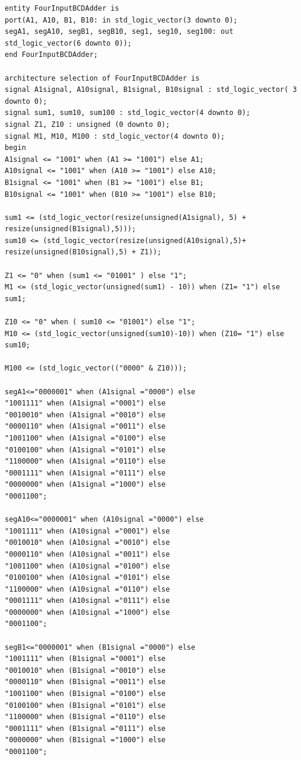 \begin{enumerate}
\begin{lstlisting}[caption={To-input BCD adder med 3-cifret output},label={lst:TwoInputBCDAdder3Output}]
entity FourInputBCDAdder is
port(A1, A10, B1, B10: in std_logic_vector(3 downto 0);
segA1, segA10, segB1, segB10, seg1, seg10, seg100: out std_logic_vector(6 downto 0));
end FourInputBCDAdder;

architecture selection of FourInputBCDAdder is
signal A1signal, A10signal, B1signal, B10signal : std_logic_vector( 3 downto 0);
signal sum1, sum10, sum100 : std_logic_vector(4 downto 0);
signal Z1, Z10 : unsigned (0 downto 0);
signal M1, M10, M100 : std_logic_vector(4 downto 0);
begin
A1signal <= "1001" when (A1 >= "1001") else A1;
A10signal <= "1001" when (A10 >= "1001") else A10;
B1signal <= "1001" when (B1 >= "1001") else B1;
B10signal <= "1001" when (B10 >= "1001") else B10;

sum1 <= (std_logic_vector(resize(unsigned(A1signal), 5) + resize(unsigned(B1signal),5)));
sum10 <= (std_logic_vector(resize(unsigned(A10signal),5)+ resize(unsigned(B10signal),5) + Z1));

Z1 <= "0" when (sum1 <= "01001" ) else "1"; 
M1 <= (std_logic_vector(unsigned(sum1) - 10)) when (Z1= "1") else sum1;

Z10 <= "0" when ( sum10 <= "01001") else "1";
M10 <= (std_logic_vector(unsigned(sum10)-10)) when (Z10= "1") else sum10;

M100 <= (std_logic_vector(("0000" & Z10)));

segA1<="0000001" when (A1signal ="0000") else
"1001111" when (A1signal ="0001") else
"0010010" when (A1signal ="0010") else
"0000110" when (A1signal ="0011") else
"1001100" when (A1signal ="0100") else
"0100100" when (A1signal ="0101") else
"1100000" when (A1signal ="0110") else
"0001111" when (A1signal ="0111") else
"0000000" when (A1signal ="1000") else
"0001100";

segA10<="0000001" when (A10signal ="0000") else
"1001111" when (A10signal ="0001") else
"0010010" when (A10signal ="0010") else
"0000110" when (A10signal ="0011") else
"1001100" when (A10signal ="0100") else
"0100100" when (A10signal ="0101") else
"1100000" when (A10signal ="0110") else
"0001111" when (A10signal ="0111") else
"0000000" when (A10signal ="1000") else
"0001100";

segB1<="0000001" when (B1signal ="0000") else
"1001111" when (B1signal ="0001") else
"0010010" when (B1signal ="0010") else
"0000110" when (B1signal ="0011") else
"1001100" when (B1signal ="0100") else
"0100100" when (B1signal ="0101") else
"1100000" when (B1signal ="0110") else
"0001111" when (B1signal ="0111") else
"0000000" when (B1signal ="1000") else
"0001100";


\end{lstlisting}
\end{enumerate}
